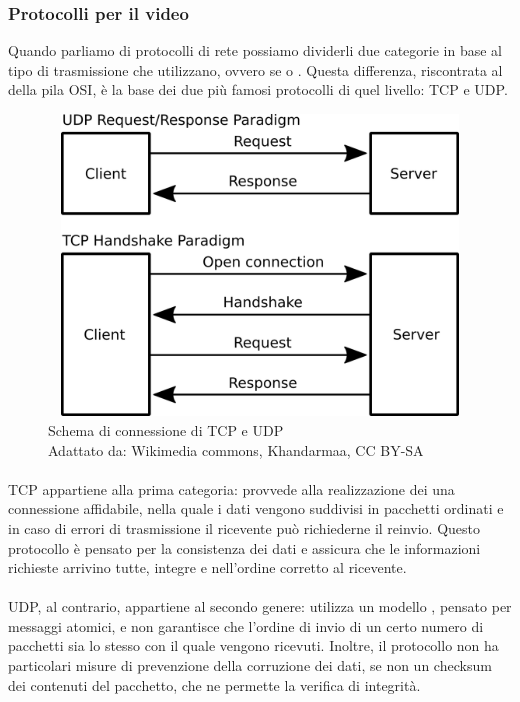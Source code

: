 		\subsubsection{Protocolli per il video }
			Quando parliamo di protocolli di rete possiamo dividerli due categorie in base al tipo di trasmissione che utilizzano, ovvero se  o . Questa differenza, riscontrata al  della pila \gls{OSI}, è la base dei due più famosi protocolli di quel livello: \gls{TCP} e \gls{UDP}.\@
			\begin{figure}[H]
				\begin{center}
					\includegraphics[width=16.5cm,height=8cm,keepaspectratio]{immagini/tcp-udp-connections}	
					\caption[Schema di connessione di TCP e UDP]{Schema di connessione di \gls{TCP} e \gls{UDP}
					\\
					Adattato da: Wikimedia commons, Khandarmaa, CC BY-SA}
				\end{center}
			\end{figure}
			\paragraph*{} \gls{TCP} appartiene alla prima categoria: provvede alla realizzazione dei una connessione affidabile, nella quale i dati vengono suddivisi in pacchetti ordinati e in caso di errori di trasmissione il ricevente può richiederne il reinvio. Questo protocollo è pensato per la consistenza dei dati e assicura che le informazioni richieste arrivino tutte, integre e nell'ordine corretto al ricevente.
			\paragraph*{}
			\gls{UDP}, al contrario, appartiene al secondo genere: utilizza un modello , pensato per messaggi atomici, e non garantisce che l'ordine di invio di un certo numero di pacchetti sia lo stesso con il quale vengono ricevuti. Inoltre, il protocollo non ha particolari misure di prevenzione della corruzione dei dati, se non un checksum dei contenuti del pacchetto, che ne permette la verifica di integrità.
